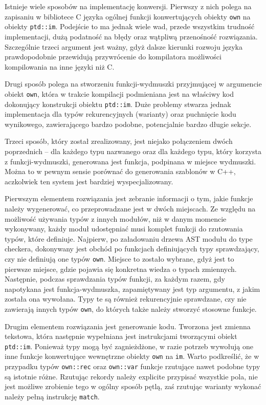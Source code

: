 \documentclass[licencjacka]{pracamgr}
\begin{document}
Istnieje wiele sposobów na implementację konwersji. Pierwszy z nich polega na zapisaniu w bibliotece C języka ogólnej funkcji konwertujących obiekty \texttt{own} na obiekty \texttt{ptd::im}.
Podejście to ma jednak wiele wad, przede wszystkim trudność implementacji, dużą podatność na błędy oraz wątpliwą przenośność rozwiązania.
Szczególnie trzeci argument jest ważny, gdyż dalsze kierunki rozwoju języka prawdopodobnie przewidują przywrócenie do kompilatora możliwości kompilowania na inne języki niż C.

Drugi sposób polega na stworzeniu funkcji-wydmuszki przyjmującej w argumencie obiekt \texttt{own}, która w trakcie kompilacji podmieniana jest na właściwy kod dokonujący konstrukcji obiektu \texttt{ptd::im}.
Duże problemy stwarza jednak implementacja dla typów rekurencyjnych (warianty) oraz puchnięcie kodu wynikowego, zawierającego bardzo podobne, potencjalnie bardzo długie sekcje.

Trzeci sposób, który został zrealizowany, jest niejako połączeniem dwóch poprzednich -- dla każdego typu
nazwanego oraz dla każdego typu, który korzysta z funkcji-wydmuszki, generowana jest funkcja,
podpinana w miejsce wydmuszki. Można to w pewnym sensie porównać do generowania szablonów w C++, aczkolwiek ten system jest bardziej wyspecjalizowany.

Pierwszym elementem rozwiązania jest zebranie informacji o tym, jakie funkcje należy wygenerować,
co przeprowadzane jest w dwóch miejscach.
Ze względu na możliwość używania typów z innych modułów, niż w danym momencie wykonywany, każdy moduł udostępniać musi komplet funkcji do rzutowania typów, które definiuje.
Najpierw, po załadowaniu drzewa AST modułu do type checkera, dokonywany jest obchód po funkcjach definiujących typy sprawdzający, czy nie definiują one typów \texttt{own}.
Miejsce to zostało wybrane, gdyż jest to pierwsze miejsce, gdzie pojawia się konkretna wiedza o typach zmiennych.
Następnie, podczas sprawdzania typów funkcji, za każdym razem, gdy napotykana jest funkcja-wydmuszka, zapamiętywany jest typ argumentu, z jakim została ona wywołana.
Typy te są również rekurencyjnie sprawdzane, czy nie zawierają innych typów \texttt{own}, do których także należy stworzyć stosowne funkcje.

Drugim elementem rozwiązania jest generowanie kodu. Tworzona jest zmienna tekstowa, która następnie wypełniana jest instrukcjami tworzącymi obiekt \texttt{ptd::im}.
Ponieważ typy mogą być zagnieżdżone, w razie potrzeb wywołują one inne funkcje konwertujące wewnętrzne obiekty \texttt{own} na \texttt{im}.
Warto podkreślić, że w przypadku typów \texttt{own::rec} oraz \texttt{own::var} funkcje rzutujące nawet podobne typy są istotnie różne.
Rzutując rekordy należy explicite przypisać wszystkie pola, nie jest możliwe zrobienie tego w ogólny sposób pętlą, zaś rzutując warianty
wykonać należy pełną instrukcję \texttt{match}.
\end{document}
